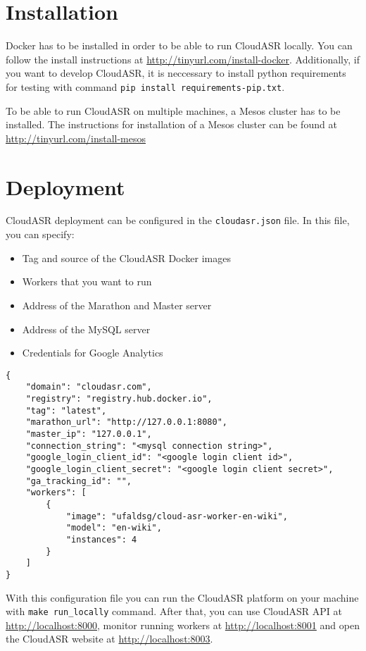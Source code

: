 \section{Installation}
Docker has to be installed in order to be able to run CloudASR locally.
You can follow the install instructions at \url{http://tinyurl.com/install-docker}.
Additionally, if you want to develop CloudASR, it is neccessary to install python requirements for testing with command \texttt{pip install requirements-pip.txt}.

To be able to run CloudASR on multiple machines, a Mesos cluster has to be installed.
The instructions for installation of a Mesos cluster can be found at \url{http://tinyurl.com/install-mesos}


\section{Deployment}
CloudASR deployment can be configured in the \texttt{cloudasr.json} file.
In this file, you can specify:

\begin{itemize}
    \item Tag and source of the CloudASR Docker images
    \item Workers that you want to run
    \item Address of the Marathon and Master server
    \item Address of the MySQL server
    \item Credentials for Google Analytics
\end{itemize}


\begin{verbatim}{
    "domain": "cloudasr.com",
    "registry": "registry.hub.docker.io",
    "tag": "latest",
    "marathon_url": "http://127.0.0.1:8080",
    "master_ip": "127.0.0.1",
    "connection_string": "<mysql connection string>",
    "google_login_client_id": "<google login client id>",
    "google_login_client_secret": "<google login client secret>",
    "ga_tracking_id": "",
    "workers": [
        {
            "image": "ufaldsg/cloud-asr-worker-en-wiki",
            "model": "en-wiki",
            "instances": 4
        }
    ]
}\end{verbatim}

With this configuration file you can run the CloudASR platform on your machine with \texttt{make run\_locally} command.
After that, you can use CloudASR API at \url{http://localhost:8000},
  monitor running workers at \url{http://localhost:8001}
  and open the CloudASR website at \url{http://localhost:8003}.

